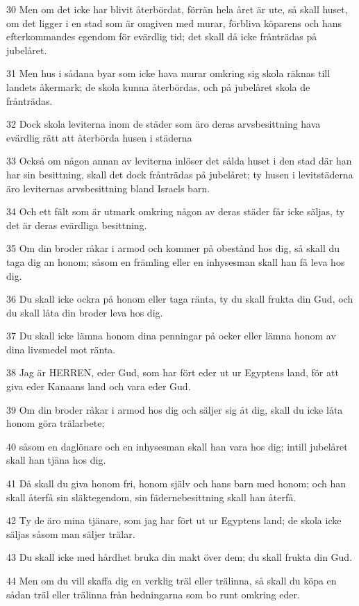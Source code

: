 \par 30 Men om det icke har blivit återbördat, förrän hela året är ute, så skall huset, om det ligger i en stad som är omgiven med murar, förbliva köparens och hans efterkommandes egendom för evärdlig tid; det skall då icke frånträdas på jubelåret.
\par 31 Men hus i sådana byar som icke hava murar omkring sig skola räknas till landets åkermark; de skola kunna återbördas, och på jubelåret skola de frånträdas.
\par 32 Dock skola leviterna inom de städer som äro deras arvsbesittning hava evärdlig rätt att återbörda husen i städerna
\par 33 Också om någon annan av leviterna inlöser det sålda huset i den stad där han har sin besittning, skall det dock frånträdas på jubelåret; ty husen i levitstäderna äro leviternas arvsbesittning bland Israels barn.
\par 34 Och ett fält som är utmark omkring någon av deras städer får icke säljas, ty det är deras evärdliga besittning.
\par 35 Om din broder råkar i armod och kommer på obestånd hos dig, så skall du taga dig an honom; såsom en främling eller en inhysesman skall han få leva hos dig.
\par 36 Du skall icke ockra på honom eller taga ränta, ty du skall frukta din Gud, och du skall låta din broder leva hos dig.
\par 37 Du skall icke lämna honom dina penningar på ocker eller lämna honom av dina livsmedel mot ränta.
\par 38 Jag är HERREN, eder Gud, som har fört eder ut ur Egyptens land, för att giva eder Kanaans land och vara eder Gud.
\par 39 Om din broder råkar i armod hos dig och säljer sig åt dig, skall du icke låta honom göra trälarbete;
\par 40 såsom en daglönare och en inhysesman skall han vara hos dig; intill jubelåret skall han tjäna hos dig.
\par 41 Då skall du giva honom fri, honom själv och hans barn med honom; och han skall återfå sin släktegendom, sin fädernebesittning skall han återfå.
\par 42 Ty de äro mina tjänare, som jag har fört ut ur Egyptens land; de skola icke säljas såsom man säljer trälar.
\par 43 Du skall icke med hårdhet bruka din makt över dem; du skall frukta din Gud.
\par 44 Men om du vill skaffa dig en verklig träl eller trälinna, så skall du köpa en sådan träl eller trälinna från hedningarna som bo runt omkring eder.
